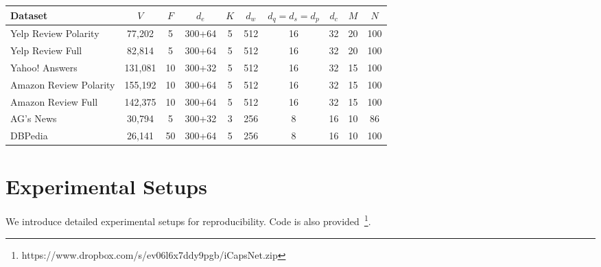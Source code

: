 \documentclass[10pt,journal,compsoc]{IEEEtran}
\begin{document}
\begin{table*}[!t]
	\caption{Hyperparameter settings of iCapsNets$_{Long}$ on the 7 datasets from Zhang et al.~\cite{zhang2015character}. Explanations of these hyperparameters are provided in Section~\ref{appen:1}.}
	\begin{center}
		\begin{tabular}{l|ccccccccc}
			Dataset & $V$ & $F$ & $d_e$ & $K$ & $d_w$ & $d_q=d_s=d_p$ & $d_c$ & $M$ & $N$ \\
			\hline
			Yelp Review Polarity & 77,202 & 5 & 300+64 & 5 & 512 & 16 & 32 & 20 & 100 \\
			Yelp Review Full & 82,814 & 5 & 300+64 & 5 & 512 & 16 & 32 & 20 & 100 \\
			Yahoo! Answers & 131,081 & 10 & 300+32 & 5 & 512 & 16 & 32 & 15 & 100 \\
			Amazon Review Polarity & 155,192 & 10 & 300+64 & 5 & 512 & 16 & 32 & 15 & 100 \\
			Amazon Review Full & 142,375 & 10 & 300+64 & 5 & 512 & 16 & 32 & 15 & 100 \\
			AG's News & 30,794 & 5 & 300+32 & 3 & 256 & 8 & 16 & 10 & 86 \\
			DBPedia & 26,141 & 50 & 300+64 & 5 & 256 & 8 & 16 & 10 & 100 \\
		\end{tabular}
		\label{table:long_setup}
	\end{center}
\end{table*}

\section{Experimental Setups}\label{appen:1}

We introduce detailed experimental setups for reproducibility. Code is also provided~\footnote{https://www.dropbox.com/s/ev06l6x7ddy9pgb/iCapsNet.zip}.
\end{document}
